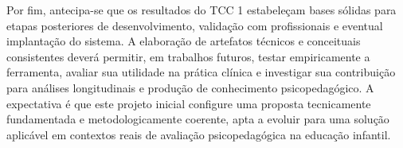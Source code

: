 Por fim, antecipa-se que os resultados do TCC 1 estabeleçam bases sólidas para etapas posteriores de desenvolvimento, validação com profissionais e eventual implantação do sistema. A elaboração de artefatos técnicos e conceituais consistentes deverá permitir, em trabalhos futuros, testar empiricamente a ferramenta, avaliar sua utilidade na prática clínica e investigar sua contribuição para análises longitudinais e produção de conhecimento psicopedagógico. A expectativa é que este projeto inicial configure uma proposta tecnicamente fundamentada e metodologicamente coerente, apta a evoluir para uma solução aplicável em contextos reais de avaliação psicopedagógica na educação infantil.
